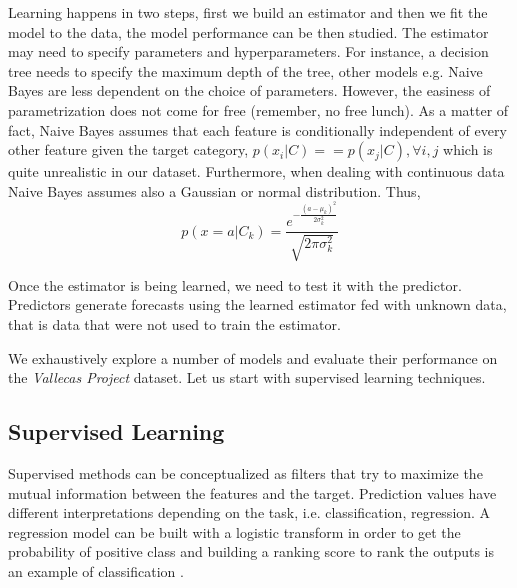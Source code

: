 \documentclass[11pt]{article}
\theoremstyle{definition}
\theoremstyle{remark}
\begin{document}
Learning happens in two steps, first we build an estimator and then we fit the model to the data, the model performance can be then studied. The estimator may need to specify parameters and hyperparameters. For instance, a decision tree needs to specify the maximum depth of the tree, other models e.g. Naive Bayes are less dependent on the choice of parameters. However, the easiness of parametrization does not come for free (remember, no free lunch). As a matter of fact, Naive Bayes assumes that each feature is conditionally independent of every other feature given the target category, $p(x_i|C) == p(x_j|C), \forall i,j$ which is quite unrealistic in our dataset. Furthermore, when dealing with continuous data Naive Bayes assumes also a Gaussian or normal distribution. Thus, 
\begin{equation}
p(x = a|C_k) = \frac{e^{-\frac{(a-\mu_k)^2}{2\sigma_k^{2}}}} {\sqrt{2\pi\sigma_k^{2}}}
\label{eq:gauss}
\end{equation}

Once the estimator is being learned, we need to test it with the predictor. Predictors generate forecasts using the learned estimator fed with unknown data, that is data that were not used to train the estimator.

We exhaustively explore a number of models and evaluate their performance on the \emph{Vallecas Project} dataset. Let us start with supervised learning techniques.

\subsection{Supervised Learning}
\label{sse:sup}
Supervised methods can be conceptualized as filters that try to maximize the mutual information between the features and the target. Prediction values have different interpretations depending on the task, i.e. classification, regression. A regression model can be built with  a logistic transform in order to get the probability of positive class and building a ranking score to rank the outputs is an example of classification \cite{patania2017topological}.
\end{document}
